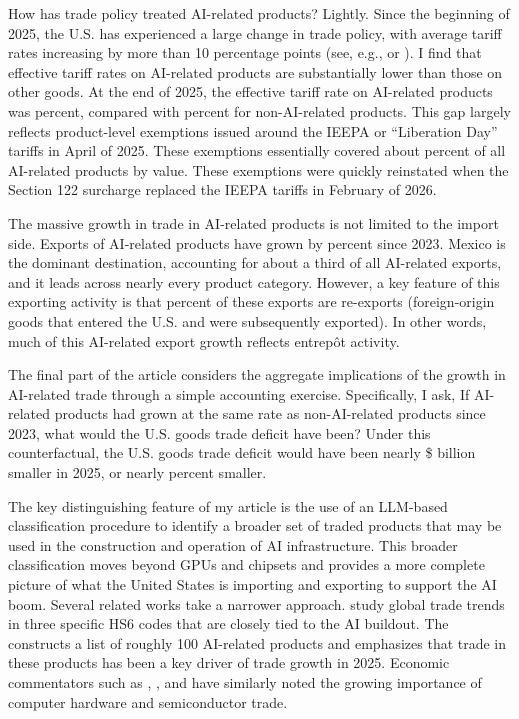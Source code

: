\documentclass[12pt,pdftex]{article}
\begin{document}
\begin{onehalfspacing}
How has trade policy treated AI-related products? Lightly. Since the beginning of 2025, the U.S. has experienced a large change in trade policy, with average tariff rates increasing by more than 10 percentage points (see, e.g., \citealt{waugh2026restrictive} or \citealt{budgetlab2025tariffs}). I find that effective tariff rates on AI-related products are substantially lower than those on other goods. At the end of 2025, the effective tariff rate on AI-related products was \tariffHighTwentyFive{} percent, compared with \tariffLowTwentyFive{} percent for non-AI-related products. This gap largely reflects product-level exemptions issued around the IEEPA or ``Liberation Day'' tariffs in April of 2025. These exemptions essentially covered about \exemptionAnyPct{} percent of all AI-related products by value. These exemptions were quickly reinstated when the Section 122 surcharge replaced the IEEPA tariffs in February of 2026.

The massive growth in trade in AI-related products is not limited to the import side. Exports of AI-related products have grown by \aiExportGrowth{} percent since 2023. Mexico is the dominant destination, accounting for about a third of all AI-related exports, and it leads across nearly every product category. However, a key feature of this exporting activity is that \aiReexportShare{} percent of these exports are re-exports (foreign-origin goods that entered the U.S. and were subsequently exported). In other words, much of this AI-related export growth reflects entrep\^{o}t activity.  


The final part of the article considers the aggregate implications of the growth in AI-related trade through a simple accounting exercise. Specifically, I ask, If AI-related products had grown at the same rate as non-AI-related products since 2023, what would the U.S. goods trade deficit have been? Under this counterfactual, the U.S. goods trade deficit would have been nearly \$\cfNetAiEffect{} billion smaller in 2025, or nearly \cfDeficitReductionPct{} percent smaller. 

The key distinguishing feature of my article is the use of an LLM-based classification procedure to identify a broader set of traded products that may be used in the construction and operation of AI infrastructure. This broader classification moves beyond GPUs and chipsets and provides a more complete picture of what the United States is importing and exporting to support the AI boom. Several related works take a narrower approach. \citet{de2026global} study global trade trends in three specific HS6 codes that are closely tied to the AI buildout. The \citet{wto2025gtos} constructs a list of roughly 100 AI-related products and emphasizes that trade in these products has been a key driver of trade growth in 2025. Economic commentators such as \citet{setser2026tradedeficit}, \citet{politano2025tariffexemption}, and \citet{swanson2026aitradedeficit} have similarly noted the growing importance of computer hardware and semiconductor trade. 


\end{onehalfspacing}
\end{document}
